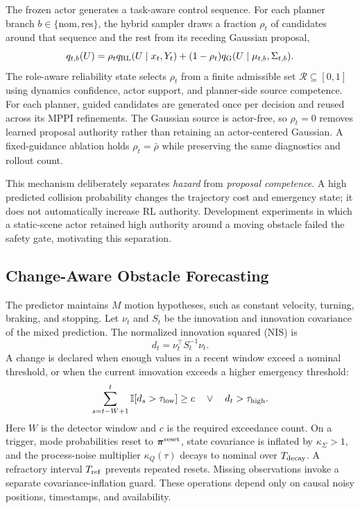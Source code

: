 \documentclass[conference]{IEEEtran}
\begin{document}
The frozen actor generates a task-aware control sequence. For each planner branch $b\in\{\mathrm{nom},\mathrm{res}\}$, the hybrid sampler draws a fraction $\rho_t$ of candidates around that sequence and the rest from its receding Gaussian proposal,
\begin{equation}
q_{t,b}(U)=\rho_t q_{\rm RL}(U\mid x_t,Y_t)
       +(1-\rho_t)q_{\rm G}(U\mid\mu_{t,b},\Sigma_{t,b}).
\label{eq:hss}
\end{equation}
The role-aware reliability state selects $\rho_t$ from a finite admissible set $\mathcal{R}\subseteq[0,1]$ using dynamics confidence, actor support, and planner-side source competence. For each planner, guided candidates are generated once per decision and reused across its MPPI refinements. The Gaussian source is actor-free, so $\rho_t=0$ removes learned proposal authority rather than retaining an actor-centered Gaussian. A fixed-guidance ablation holds $\rho_t=\bar{\rho}$ while preserving the same diagnostics and rollout count.

This mechanism deliberately separates \emph{hazard} from \emph{proposal competence}. A high predicted collision probability changes the trajectory cost and emergency state; it does not automatically increase RL authority. Development experiments in which a static-scene actor retained high authority around a moving obstacle failed the safety gate, motivating this separation.

\subsection{Change-Aware Obstacle Forecasting}

The predictor maintains $M$ motion hypotheses, such as constant velocity, turning, braking, and stopping. Let $\nu_t$ and $S_t$ be the innovation and innovation covariance of the mixed prediction. The normalized innovation squared (NIS) is
\begin{equation}
    d_t=\nu_t^\top S_t^{-1}\nu_t.
    \label{eq:nis}
\end{equation}
A change is declared when enough values in a recent window exceed a nominal threshold, or when the current innovation exceeds a higher emergency threshold:
\begin{equation}
\sum_{s=t-W+1}^{t}\mathbb{I}[d_s>\tau_{\rm low}]\ge c
\quad\lor\quad
d_t>\tau_{\rm high}.
\label{eq:change}
\end{equation}
Here $W$ is the detector window and $c$ is the required exceedance count. On a trigger, mode probabilities reset to $\boldsymbol{\pi}^{\rm reset}$, state covariance is inflated by $\kappa_\Sigma>1$, and the process-noise multiplier $\kappa_Q(\tau)$ decays to nominal over $T_{\rm decay}$. A refractory interval $T_{\rm ref}$ prevents repeated resets. Missing observations invoke a separate covariance-inflation guard. These operations depend only on causal noisy positions, timestamps, and availability.
\end{document}
